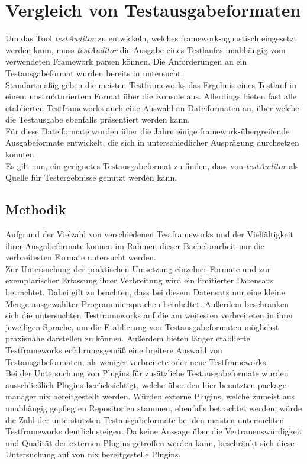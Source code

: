\chapter{Vergleich von Testausgabeformaten}\label{Vergleich Testausgabefomate}
Um das Tool \textit{testAuditor} zu entwickeln, welches framework-agnostisch eingesetzt werden kann, muss \textit{testAuditor} die Ausgabe eines Testlaufes unabhängig vom verwendeten Framework parsen können. Die Anforderungen an ein Testausgabeformat wurden bereits in  untersucht.\\
Standartmäßig geben die meisten Testframeworks das Ergebnis eines Testlauf in einem unstrukturiertem Format über die Konsole aus. Allerdings bieten fast alle etablierten Testframeworks auch eine Auswahl an Dateiformaten an, über welche die Testausgabe ebenfalls präsentiert werden kann.\\
Für diese Dateiformate wurden über die Jahre einige framework-übergreifende Ausgabeformate entwickelt, die sich in unterschiedlicher Ausprägung durchsetzen konnten.\\
Es gilt nun, ein geeignetes Testausgabeformat zu finden, dass von \textit{testAuditor} als Quelle für Testergebnisse genutzt werden kann. 

\section{Methodik}
Aufgrund der Vielzahl von verschiedenen Testframeworks und der Vielfältigkeit ihrer Ausgabeformate können im Rahmen dieser Bachelorarbeit nur die verbreitesten Formate untersucht werden.\\
Zur Untersuchung der praktischen Umsetzung einzelner Formate und zur exemplarischer Erfassung ihrer Verbreitung wird ein limitierter Datensatz betrachtet. Dabei gilt zu beachten, dass bei diesem Datensatz nur eine kleine Menge ausgewählter Programmiersprachen beinhaltet. Außerdem beschränken sich die untersuchten Testframeworks auf die am weitesten verbreiteten in ihrer jeweiligen Sprache, um die Etablierung von Testausgabeformaten möglichst praxisnahe darstellen zu können. Außerdem bieten länger etablierte Testframeworks erfahrungsgemäß eine breitere Auswahl von Testausgabeformaten, als weniger verbreitete oder neue Testframeworks.\\
Bei der Untersuchung von Plugins für zusätzliche Testausgabeformate wurden ausschließlich Plugins berücksichtigt, welche über den hier benutzten package manager nix bereitgestellt werden. Würden externe Plugins, welche zumeist aus unabhängig gepflegten Repositorien stammen, ebenfalls betrachtet werden, würde die Zahl der unterstützten Testausgabeformate bei den meisten untersuchten Testframeworks deutlich steigen. Da keine Aussage über die Vertrauenswürdigkeit und Qualität der externen Plugins getroffen werden kann, beschränkt sich diese Untersuchung auf von nix bereitgestelle Plugins.
